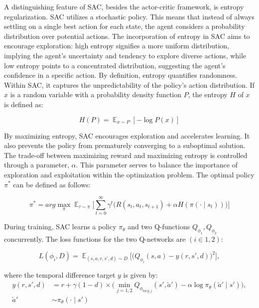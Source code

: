 A distinguishing feature of SAC, besides the actor-critic framework, is entropy regularization\cite{achiam2018spinning}. SAC utilizes a stochastic policy. This means that instead of always settling on a single best action for each state, the agent considers a probability distribution over potential actions. The incorporation of entropy in SAC aims to encourage exploration: high entropy signifies a more uniform distribution, implying the agent's uncertainty and tendency to explore diverse actions, while low entropy points to a concentrated distribution, suggesting the agent's confidence in a specific action. By definition, entropy quantifies randomness. Within SAC, it captures the unpredictability of the policy's action distribution. If
\(x\) is a random variable with a probability density function \(P\), the
entropy \(H\) of \(x\) is defined as:

\begin{equation}
 H(P) = \displaystyle \mathop{\mathbb{E}}_{x \sim P}[-\log P(x)]
\end{equation}

By maximizing entropy, SAC encourages exploration and accelerates learning. It
also prevents the policy from prematurely converging to a suboptimal solution.
The trade-off between maximizing reward and maximizing entropy is controlled
through a parameter, \(\alpha\). This parameter serves to balance the importance
of exploration and exploitation within the optimization problem. The optimal policy
\(\pi^*\) can be defined as follows:

\begin{equation}
 \pi^* = {arg}{\max_{\pi}}{\displaystyle
 \mathop{\mathbb{E}}_{\tau\sim\pi}}{\Bigg[{\sum_{t=0}^{\infty}}{\gamma^{t}}{\Big(R(s_t,a_t,s_{t+1})}+{\alpha}H(\pi(\cdot\mid{s_t}))\Big)\Bigg]}
\end{equation}

During training, SAC learns a policy $\pi_{\theta}$ and two Q-functions
$Q_{\phi_1} , Q_{\phi_2}$ concurrently. The loss functions for the two Q-networks are
$(i \in {1, 2})$:

\begin{equation}
  L(\phi_i,D) = \displaystyle
  \mathop{\mathbb{E}}_{(s,a,r,s',d)\sim{D}}\bigg[\bigg(Q_{\phi_i}(s,a)-y(r,s',d)\bigg)^2\bigg],
\end{equation}

where the temporal difference target \(y\) is given by:
\begin{align}
  y(r,s',d) &= r + \gamma(1-d) \times \nonumber\bigg(\displaystyle
  \mathop{\min}_{j=1,2}Q_{\phi_{targ,j}}(s',\tilde{a}')-\alpha\log
  {\pi_\theta}(\tilde{a}'\mid{s}')\bigg), \\
  \tilde{a}'&\sim{\pi_\theta}(\cdot\mid{s'})
\end{align}

